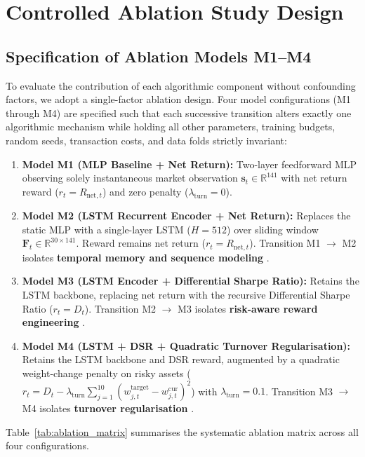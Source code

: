\chapter{Controlled Ablation Study Design}
\label{ch:ablation}

\section{Specification of Ablation Models M1--M4}
To evaluate the contribution of each algorithmic component without confounding factors, we adopt a single-factor ablation design. Four model configurations (M1 through M4) are specified such that each successive transition alters exactly one algorithmic mechanism while holding all other parameters, training budgets, random seeds, transaction costs, and data folds strictly invariant:
\begin{enumerate}
    \setlength{\itemsep}{1.5pt}
    \setlength{\parskip}{0pt}
    \item \textbf{Model M1 (MLP Baseline + Net Return):} Two-layer feedforward MLP observing solely instantaneous market observation $\mathbf{s}_t \in \mathbb{R}^{141}$ with net return reward ($r_t = R_{\text{net},t}$) and zero penalty ($\lambda_{\text{turn}} = 0$).
    \item \textbf{Model M2 (LSTM Recurrent Encoder + Net Return):} Replaces the static MLP with a single-layer LSTM ($H=512$) over sliding window $\mathbf{F}_t \in \mathbb{R}^{30 \times 141}$. Reward remains net return ($r_t = R_{\text{net},t}$). Transition M1 $\to$ M2 isolates \textbf{temporal memory and sequence modeling} \citep{zou2024novel}.
    \item \textbf{Model M3 (LSTM Encoder + Differential Sharpe Ratio):} Retains the LSTM backbone, replacing net return with the recursive Differential Sharpe Ratio ($r_t = D_t$). Transition M2 $\to$ M3 isolates \textbf{risk-aware reward engineering} \citep{millea2021deep}.
    \item \textbf{Model M4 (LSTM + DSR + Quadratic Turnover Regularisation):} Retains the LSTM backbone and DSR reward, augmented by a quadratic weight-change penalty on risky assets ($r_t = D_t - \lambda_{\text{turn}} \sum_{j=1}^{10} (w_{j,t}^{\text{target}} - w_{j,t}^{\text{cur}})^2$) with $\lambda_{\text{turn}} = 0.1$. Transition M3 $\to$ M4 isolates \textbf{turnover regularisation} \citep{wang2025risk}.
\end{enumerate}

Table~\ref{tab:ablation_matrix} summarises the systematic ablation matrix across all four configurations.

